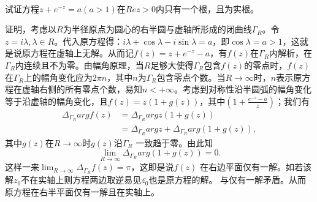 \begin{exercise}
\hfill\\
试证方程$z+e^{-z}=a(a>1)$在$Rez>0$内只有一个根，且为实根。

证明，考虑以$R$为半径原点为圆心的右半圆与虚轴所形成的闭曲线$\Gamma_R$。令$z=i\lambda,\lambda\in R$。代入原方程得：$i\lambda+\cos\lambda-i\sin\lambda=a$，即$\cos\lambda=a>1$，这就是说原方程在虚轴上无解。从而记$f(z)=z+e^{-z}-a$，有$f(z)$在$\Gamma_R$内解析，在$\Gamma_R$内连续且不为零。由幅角原理，当$R$足够大使得$\Gamma_R$包含$f(z)$的零点时，$f(z)$在$\Gamma_R$上的幅角变化应为$2\pi n$，其中$n$为$\Gamma_R$包含零点个数。当$R\rightarrow\infty$时，$n$表示原方程在虚轴右侧的所有零点个数，易知$n<+\infty$。考虑到对称性沿半圆弧的幅角变化等于沿虚轴的幅角变化，且$f(z)=z(1+g(z))$，其中$(1+\frac{e^{-z}-a}{z})$；我们有
\[
\begin{aligned}
\Delta_{\Gamma_R}argf(z)&=\Delta_{\Gamma_R}argz(1+g(z))\\
&=\Delta_{\Gamma_R}argz+\Delta_{\Gamma_R}arg(1+g(z)),
\end{aligned}
\]
其中$g(z)$在$R\rightarrow\infty$时$g(z)$沿$\Gamma_R$
一致趋于零。由此知\[\lim_{R\rightarrow\infty}\Delta_{\Gamma_R}arg(1+g(z))=0.\]
这样一来$\lim_{R\rightarrow\infty}\Delta_{\Gamma_R}f(z)=\pi$，这即是说$f(z)$
在右边平面仅有一解。如若该解$z_0$不在实轴上则方程两边取逆易见$\overline{z_0}$也是原方程的解。
与仅有一解矛盾。从而原方程在右半平面仅有一解且在实轴上。

\end{exercise}



